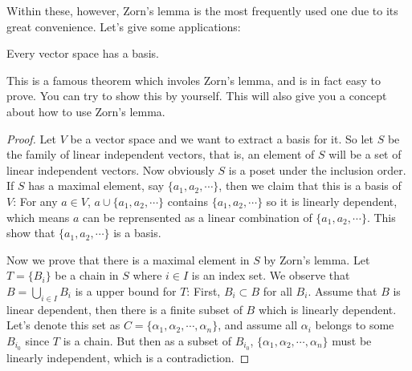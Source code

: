 Within these, however, Zorn's lemma is the most frequently used one due to its great convenience. Let's give some applications:
\begin{theorem}
Every vector space has a basis.
\end{theorem}
This is a famous theorem which involes Zorn's lemma, and is in fact easy to prove. You can try to show this by yourself. This will also give you a concept about how to use Zorn's lemma.
\begin{proof}
Let $V$ be a vector space and we want to extract a basis for it. So let $S$ be the family of linear independent vectors, that is, an element of $S$ will be a set of linear independent vectors. Now obviously $S$ is a poset under the inclusion order. If $S$ has a maximal element, say $\{a_1,a_2,\cdots\}$, then we claim that this is a basis of $V$: For any $a\in V$, $a\cup\{a_1,a_2,\cdots\}$ contains $\{a_1,a_2,\cdots\}$ so it is linearly dependent, which means $a$ can be reprensented as a linear combination of $\{a_1,a_2,\cdots\}$. This show that $\{a_1,a_2,\cdots\}$ is a basis.\par
Now we prove that there is a maximal element in $S$ by Zorn's lemma. Let $T=\{B_i\}$ be a chain in $S$ where $i\in I$ is an index set. We observe that $B=\bigcup_{i\in I}B_i$ is a upper bound for $T$: First, $B_i\subset B$ for all $B_i$. Assume that $B$ is linear dependent, then there is a finite subset of $B$ which is linearly dependent. Let's denote this set as $C=\{\alpha_1,\alpha_2,\cdots,\alpha_n\}$, and assume all $\alpha_i$ belongs to some $B_{i_0}$ since $T$ is a chain. But then as a subset of $B_{i_0}$, $\{\alpha_1,\alpha_2,\cdots,\alpha_n\}$ must be linearly independent, which is a contradiction.
\end{proof}